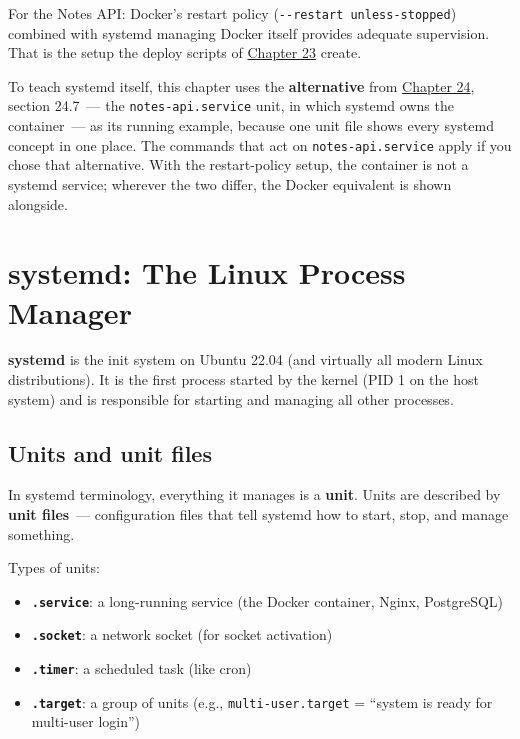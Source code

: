 \noindent{}For the Notes API: Docker's restart policy (\texttt{-}\allowbreak{}\texttt{-}\allowbreak{}\texttt{restart\ unless-}\allowbreak{}\texttt{stopped}) combined with systemd managing Docker itself provides adequate supervision. That is the setup the deploy scripts of \hyperref[ch:23-code-transfer]{Chapter 23} create.

To teach systemd itself, this chapter uses the \textbf{alternative} from \hyperref[ch:24-process-startup]{Chapter 24}, section 24.7~--- the \texttt{notes-api.service} unit, in which systemd owns the container~--- as its running example, because one unit file shows every systemd concept in one place. The commands that act on \texttt{notes-api.service} apply if you chose that alternative. With the restart-policy setup, the container is not a systemd service; wherever the two differ, the Docker equivalent is shown alongside.

\setcounter{section}{1}
\section{systemd: The Linux Process Manager}\label{25-process-management:252-systemd-the-linux-process-manager}

\textbf{systemd} is the init system on Ubuntu 22.04 (and virtually all modern Linux distributions). It is the first process started by the kernel (PID 1 on the host system) and is responsible for starting and managing all other processes.

\subsection*{Units and unit files}\label{25-process-management:units-and-unit-files}

In systemd terminology, everything it manages is a \textbf{unit}. Units are described by \textbf{unit files}~--- configuration files that tell systemd how to start, stop, and manage something.

Types of units:

\begin{itemize}
\tightlist
\item
  \textbf{\texttt{.service}}: a long-running service (the Docker container, Nginx, PostgreSQL)
\item
  \textbf{\texttt{.socket}}: a network socket (for socket activation)
\item
  \textbf{\texttt{.timer}}: a scheduled task (like cron)
\item
  \textbf{\texttt{.target}}: a group of units (e.g., \texttt{multi-user.target} = ``system is ready for multi-user login'')
\end{itemize}

